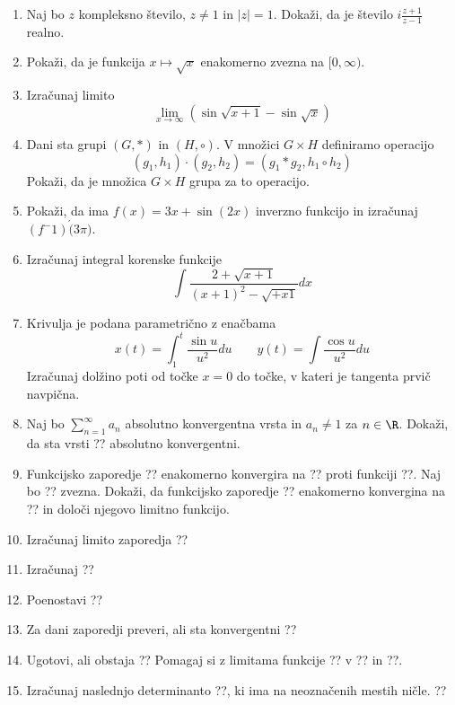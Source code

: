 \documentclass[a4paper,12pt]{article}
\begin{document}
\begin{enumerate}
\item Naj bo $z$ kompleksno število, $z \ne 1$ in $\lvert z \rvert =1$.
Dokaži, da je število $i \frac{z+1}{z-1}$ realno.

\item Pokaži, da je funkcija $x \mapsto \sqrt{x}$ enakomerno zvezna na $[0,\infty)$.

\item Izračunaj limito
$$\lim_{x\to\infty}(\sin{\sqrt{x+1}}-\sin{\sqrt{x}})$$

\item Dani sta grupi $(G,*)$ in $(H,\circ)$. V množici $G\times H$ definiramo operacijo
\[
(g_1 , h_1) \cdot (g_2 , h_2)=(g_1 * g_2 , h_1 \circ h_2)    
\]
Pokaži, da je množica $G\times H$ grupa za to operacijo.

\item Pokaži, da ima $f(x)=3x+\sin(2x)$ inverzno funkcijo in izračunaj $(f^-1)\acute(3\pi)$.

\item Izračunaj integral korenske funkcije
\[
\int{\frac{2+\sqrt{x+1}}{(x+1)^2 - \sqrt{+x1}}dx}    
\]
\item Krivulja je podana parametrično z enačbama
\[
x(t)=\int_1^t{\frac{\sin{u}}{u^2}}du \qquad y(t)=\int{\frac{\cos{u}}{u^2}du}    
\]
Izračunaj dolžino poti od točke $x=0$ do točke, v kateri je tangenta prvič navpična.

\item Naj bo $\sum_{n=1}^{\infty} {a_n}$ absolutno konvergentna vrsta in $a_n\ne 1$ za $n \in \R$.
Dokaži, da sta vrsti
??
absolutno konvergentni.

\item Funkcijsko zaporedje ?? enakomerno konvergira na ?? proti funkciji ??.
Naj bo ?? zvezna. Dokaži, da funkcijsko zaporedje ??
enakomerno konvergina na ?? in določi njegovo limitno funkcijo.

\item Izračunaj limito zaporedja
??

\item Izračunaj
??

\item Poenostavi
??

\item Za dani zaporedji preveri, ali sta konvergentni
??

\item Ugotovi, ali obstaja
??
Pomagaj si z limitama funkcije ?? v ?? in ??.

\item Izračunaj naslednjo determinanto ??, ki ima na neoznačenih mestih ničle.
??


\end{enumerate}
\end{document}
